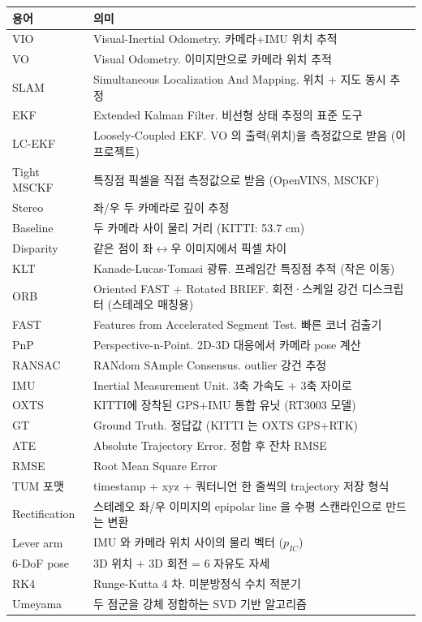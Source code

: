 \documentclass[11pt,a4paper,oneside]{report}
\begin{document}
\begin{center}\small
\begin{longtable}{lp{}}
\toprule
용어 & 의미 \\
\midrule\endhead
VIO & Visual-Inertial Odometry. 카메라+IMU 위치 추적 \\
VO & Visual Odometry. 이미지만으로 카메라 위치 추적 \\
SLAM & Simultaneous Localization And Mapping. 위치 + 지도 동시 추정 \\
EKF & Extended Kalman Filter. 비선형 상태 추정의 표준 도구 \\
LC-EKF & Loosely-Coupled EKF. VO 의 출력(위치)을 측정값으로 받음 (이 프로젝트) \\
Tight MSCKF & 특징점 픽셀을 직접 측정값으로 받음 (OpenVINS, MSCKF) \\
Stereo & 좌/우 두 카메라로 깊이 추정 \\
Baseline & 두 카메라 사이 물리 거리 (KITTI: 53.7 cm) \\
Disparity & 같은 점이 좌\(\leftrightarrow\)우 이미지에서 픽셀 차이 \\
KLT & Kanade-Lucas-Tomasi 광류. 프레임간 특징점 추적 (작은 이동) \\
ORB & Oriented FAST + Rotated BRIEF. 회전·스케일 강건 디스크립터 (스테레오 매칭용) \\
FAST & Features from Accelerated Segment Test. 빠른 코너 검출기 \\
PnP & Perspective-n-Point. 2D-3D 대응에서 카메라 pose 계산 \\
RANSAC & RANdom SAmple Consensus. outlier 강건 추정 \\
IMU & Inertial Measurement Unit. 3축 가속도 + 3축 자이로 \\
OXTS & KITTI에 장착된 GPS+IMU 통합 유닛 (RT3003 모델) \\
GT & Ground Truth. 정답값 (KITTI 는 OXTS GPS+RTK) \\
ATE & Absolute Trajectory Error. 정합 후 잔차 RMSE \\
RMSE & Root Mean Square Error \\
TUM 포맷 & timestamp + xyz + 쿼터니언 한 줄씩의 trajectory 저장 형식 \\
Rectification & 스테레오 좌/우 이미지의 epipolar line 을 수평 스캔라인으로 만드는 변환 \\
Lever arm & IMU 와 카메라 위치 사이의 물리 벡터 (\(p_{IC}\)) \\
6-DoF pose & 3D 위치 + 3D 회전 = 6 자유도 자세 \\
RK4 & Runge-Kutta 4 차. 미분방정식 수치 적분기 \\
Umeyama & 두 점군을 강체 정합하는 SVD 기반 알고리즘 \\
\bottomrule
\end{longtable}
\end{center}
\end{document}
